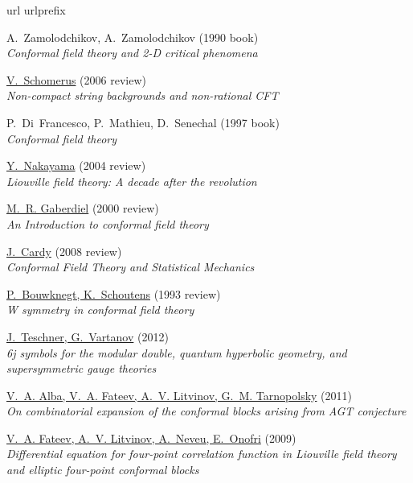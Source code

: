\begin{thebibliography}{10}
\expandafter\ifx\csname url\endcsname\relax
  \def\url#1{\texttt{#1}}\fi
\expandafter\ifx\csname urlprefix\endcsname\relax\def\urlprefix{URL }\fi
\providecommand{\eprint}[2][]{\url{#2}}

A.~Zamolodchikov, A.~Zamolodchikov (1990 book)\\ {\em {Conformal field theory
  and 2-D critical phenomena}\/}

\href{http://arxiv.org/abs/hep-th/0509155}{V.~Schomerus} (2006 review)\\ {\em
  Non-compact string backgrounds and non-rational CFT\/}

P.~Di~Francesco, P.~Mathieu, D.~Senechal (1997 book)\\ {\em Conformal field
  theory\/}

\href{http://arxiv.org/abs/hep-th/0402009}{Y.~Nakayama} (2004 review)\\ {\em
  Liouville field theory: A decade after the revolution\/}

\href{http://arxiv.org/abs/hep-th/9910156}{M.~R. Gaberdiel} (2000 review)\\
  {\em {An Introduction to conformal field theory}\/}

\href{http://arxiv.org/abs/0807.3472}{J.~Cardy} (2008 review)\\ {\em {Conformal
  Field Theory and Statistical Mechanics}\/}

\href{http://arxiv.org/abs/hep-th/9210010}{P.~Bouwknegt, K.~Schoutens} (1993
  review)\\ {\em W symmetry in conformal field theory\/}

\href{http://arxiv.org/abs/1202.4698}{J.~Teschner, G.~Vartanov} (2012)\\ {\em
  {6j symbols for the modular double, quantum hyperbolic geometry, and
  supersymmetric gauge theories}\/}

\href{http://arxiv.org/abs/1012.1312}{V.~A. Alba, V.~A. Fateev, A.~V. Litvinov,
  G.~M. Tarnopolsky} (2011)\\ {\em {On combinatorial expansion of the conformal
  blocks arising from AGT conjecture}\/}

\href{http://arxiv.org/abs/0902.1331}{V.~A. Fateev, A.~V. Litvinov, A.~Neveu,
  E.~Onofri} (2009)\\ {\em {Differential equation for four-point correlation
  function in Liouville field theory and elliptic four-point conformal
  blocks}\/}


\end{thebibliography}
